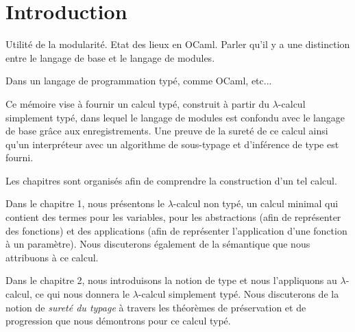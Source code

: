 \chapter*{Introduction}

Utilité de la modularité.
Etat des lieux en OCaml. Parler qu'il y a une distinction entre le langage de
base et le langage de modules.


%
%
%


Dans un langage de programmation typé, comme OCaml, etc...

Ce mémoire vise à fournir un calcul typé, construit à partir du $\lambda$-calcul
simplement typé, dans lequel le langage de modules est
confondu avec le langage de base grâce aux enregistrements. Une preuve de la sureté de ce calcul ainsi
qu'un interpréteur avec un algorithme de sous-typage et d'inférence de type est
fourni.

Les chapitres sont organisés afin de comprendre la construction d'un tel calcul.

Dans le chapitre 1, nous présentons le $\lambda$-calcul non typé, un calcul
minimal qui contient des termes pour les variables, pour les abstractions (afin
de représenter des fonctions) et des applications (afin de représenter
l'application d'une fonction à un paramètre). Nous discuterons également de la
sémantique que nous attribuons à ce calcul.

Dans le chapitre 2, nous introduisons la notion de type et nous l'appliquons au
$\lambda$-calcul, ce qui nous donnera le $\lambda$-calcul simplement typé. Nous
discuterons de la notion de \textit{sureté du typage} à travers les théorèmes
de préservation et de progression que nous démontrons pour ce calcul typé.

